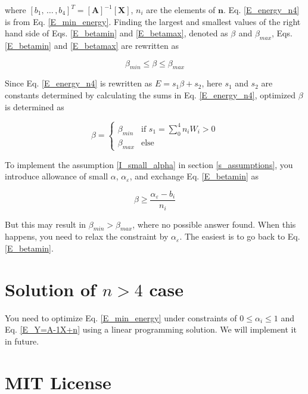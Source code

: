 \documentclass[dvipdfmx,uplatex]{article}
\begin{document}
where $ [b_1,\, \ldots\, , b_4]^T = [ \boldsymbol{A} ]^{-1} [\boldsymbol{X}] $, $n_i$ are the elements of $\boldsymbol{n}$. Eq. \ref{E_energy_n4} is from Eq. \ref{E_min_energy}. Finding the largest and smallest values of the right hand side of Eqs. \ref{E_betamin} and \ref{E_betamax}, denoted as $\beta_{}$ and $\beta_{max}$, Eqs. \ref{E_betamin} and \ref{E_betamax} are rewritten as

\begin{equation}
  \beta_{min} \leq \beta \leq \beta_{max}
\end{equation}

Since Eq. \ref{E_energy_n4} is rewritten as $E = s_1\beta + s_2$, here $s_1$ and $s_2$ are constants determined by calculating the sums in Eq. \ref{E_energy_n4}, optimized $\beta$ is determined as

\begin{equation}
    \beta = \begin{cases}
      \beta_{min}  & \text{if \(s_1 = \sum_0^4 n_i W_i > 0\)} \\
      \beta_{max}  & \text{else}
  \end{cases}
\end{equation}

To implement the assumption \ref{I_small_alpha} in section \ref{s_assumptions}, you introduce allowance of small $\alpha$, $\alpha_\varepsilon$, and exchange Eq. \ref{E_betamin} as

\begin{equation}
  \beta \geq \frac{\alpha_\varepsilon - b_i}{n_i}
\end{equation}

But this may result in $\beta_{min} > \beta_{max}$, where no possible answer found. When this happens, you need to relax the constraint by $\alpha_\varepsilon$. The easiest is to go back to Eq. \ref{E_betamin}.



\section{Solution of $n > 4$ case}
You need to optimize Eq. \ref{E_min_energy} under constraints of $0 \leq \alpha_i \leq 1$ and Eq. \ref{E_Y=A-1X+n} using a linear programming solution.
We will implement it in future.




\section*{MIT License}
\end{document}
